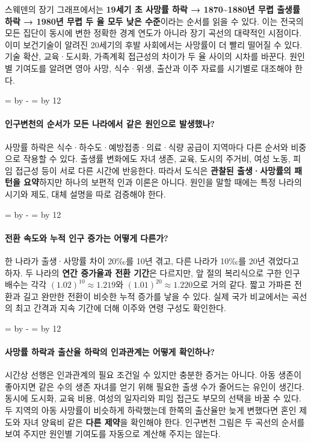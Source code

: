 \documentclass[10pt,a4paper]{article}
\newcommand{\ReserveQuestionSpace}{%
  \par\begingroup
  \dimen0=\pagegoal \advance\dimen0 by -\pagetotal
  \dimen2=\baselineskip \multiply\dimen2 by 12
  \ifdim\dimen0<\dimen2 \newpage\fi
  \endgroup}
\begin{document}
스웨덴의 장기 그래프에서는 \textbf{19세기 초 사망률 하락 → 1870\textasciitilde{}1880년 무렵 출생률 하락 → 1980년 무렵 두 율 모두 낮은 수준}이라는 순서를 읽을 수 있다. 이는 전국의 모든 집단이 동시에 변한 정확한 경계 연도가 아니라 장기 곡선의 대략적인 시점이다. 이미 보건기술이 알려진 20세기의 후발 사회에서는 사망률이 더 빨리 떨어질 수 있다. 기술 확산, 교육·도시화, 가족계획 접근성의 차이가 두 율 사이의 시차를 바꾼다. 원인별 기여도를 알려면 영아 사망, 식수·위생, 출산과 이주 자료를 시기별로 대조해야 한다.\par

\ReserveQuestionSpace
\paragraph{인구변천의 순서가 모든 나라에서 같은 원인으로 발생했나?}
사망률 하락은 식수·하수도·예방접종·의료·식량 공급이 지역마다 다른 순서와 비중으로 작용할 수 있다. 출생률 변화에도 자녀 생존, 교육, 도시의 주거비, 여성 노동, 피임 접근성 등이 서로 다른 시간에 반응한다. 따라서 도식은 \textbf{관찰된 출생·사망률의 패턴을 요약}하지만 하나의 보편적 인과 이론은 아니다. 원인을 말할 때에는 특정 나라의 시기와 제도, 대체 설명을 따로 검증해야 한다.\par

\ReserveQuestionSpace
\paragraph{전환 속도와 누적 인구 증가는 어떻게 다른가?}
한 나라가 출생·사망률 차이 20‰를 10년 겪고, 다른 나라가 10‰를 20년 겪었다고 하자. 두 나라의 \textbf{연간 증가율과 전환 기간}은 다르지만, 앞 절의 복리식으로 구한 인구 배수는 각각 $(1.02)^{10}\approx1.219$와 $(1.01)^{20}\approx1.220$으로 거의 같다. 짧고 가파른 전환과 길고 완만한 전환이 비슷한 누적 증가를 낳을 수 있다. 실제 국가 비교에서는 곡선의 최고 간격과 지속 기간에 더해 이주와 연령 구성도 확인한다.\par

\ReserveQuestionSpace
\paragraph{사망률 하락과 출산율 하락의 인과관계는 어떻게 확인하나?}
시간상 선행은 인과관계의 필요 조건일 수 있지만 충분한 증거는 아니다. 아동 생존이 좋아지면 같은 수의 생존 자녀를 얻기 위해 필요한 출생 수가 줄어드는 유인이 생긴다. 동시에 도시화, 교육 비용, 여성의 일자리와 피임 접근도 부모의 선택을 바꿀 수 있다. 두 지역의 아동 사망률이 비슷하게 하락했는데 한쪽의 출산율만 늦게 변했다면 혼인 제도와 자녀 양육비 같은 \textbf{다른 제약}을 확인해야 한다. 인구변천 그림은 두 곡선의 순서를 보여 주지만 원인별 기여도를 자동으로 계산해 주지는 않는다.\par
\end{document}
